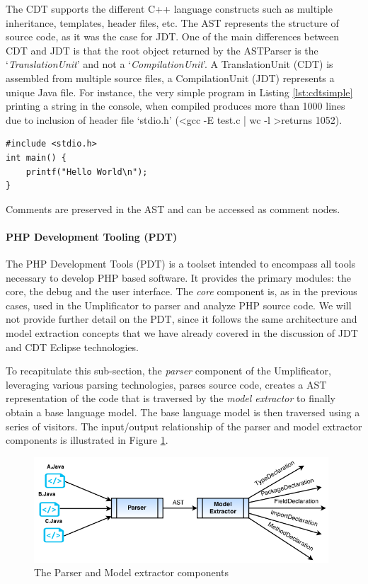 The CDT supports the different C++ language constructs such as multiple inheritance, templates, header files, etc.
The AST represents the structure of source code, as it was the case for JDT.  One of the main differences between CDT and JDT is that the root object returned by the ASTParser is the `\textit{TranslationUnit}' and not a `\textit{CompilationUnit}'. 
A TranslationUnit (CDT) is assembled from multiple source files, a CompilationUnit (JDT) represents a unique Java file.
For instance, the very simple program in Listing \ref{lst:cdtsimple} printing a string in the console, when compiled produces more than 1000 lines due to inclusion of header file `stdio.h' (\textless gcc -E test.c | wc -l \textgreater returns 1052).

\begin{lstlisting}[style=java, caption=Simple example in C++ - test.c , label=lst:cdtsimple]
#include <stdio.h>
int main() {
	printf("Hello World\n");
}
\end{lstlisting}

Comments are preserved in the AST and can be accessed as comment nodes.

\paragraph*{PHP Development Tooling (PDT)}

The PHP Development Tools (PDT) is a toolset intended to encompass all tools necessary to develop PHP based software. 
It provides the primary modules: the core, the debug and the user interface. The \textit{core} component is, as in the previous cases, used in the Umplificator to parser and analyze PHP source code.
We will not provide further detail on the PDT, since it follows the same architecture and model extraction concepts that we have already covered in the discussion of JDT and CDT Eclipse technologies.

To recapitulate this sub-section, the \textit{parser} component of the Umplificator, leveraging various parsing technologies, parses source code, creates a AST representation of the code that is traversed by the \textit{model extractor} to finally obtain a base language model. The base language model is then traversed using a series of visitors. The input/output relationship of the parser and model extractor components is illustrated in Figure \ref{fig:parserINOut}. 

\begin{figure}[h]
\centering
\includegraphics[width=0.98\textwidth]{Figures/parserINOut.png}
\caption{The Parser and Model extractor components}
\label{fig:parserINOut}
\end{figure}

